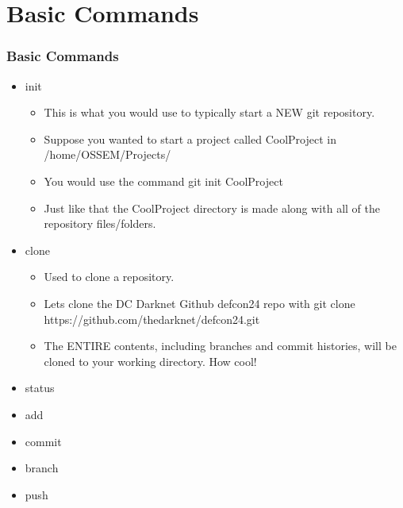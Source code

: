 \documentclass{beamer}
\begin{document}
\section{Basic Commands}
\begin{frame}
    \frametitle{Basic Commands}
    \begin{itemize}

        \item{init}
        \begin{itemize}
            \item{This is what you would use to typically start a NEW git repository.}
            \item{Suppose you wanted to start a project called CoolProject in /home/OSSEM/Projects/}
            \item{You would use the command git init CoolProject}
            \item{Just like that the CoolProject directory is made along with all of the repository files/folders.}
        \end{itemize}

        \item{clone}
        \begin{itemize}
            \item{Used to clone a repository.}
            \item{Lets clone the DC Darknet Github defcon24 repo with git clone https://github.com/thedarknet/defcon24.git}
            \item{The ENTIRE contents, including branches and commit histories, will be cloned to your working directory. How cool!}
        \end{itemize}
        
        \item{status}

        \item{add}

        \item{commit}

        \item{branch}

        \item{push}

    \end{itemize}
\end{frame}
\end{document}
